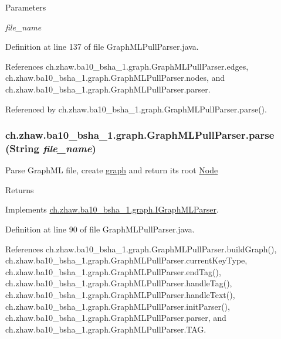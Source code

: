 \begin{DoxyParams}{Parameters}
\item[{\em file\_\-name}]\end{DoxyParams}


Definition at line 137 of file GraphMLPullParser.java.

References ch.zhaw.ba10\_\-bsha\_\-1.graph.GraphMLPullParser.edges, ch.zhaw.ba10\_\-bsha\_\-1.graph.GraphMLPullParser.nodes, and ch.zhaw.ba10\_\-bsha\_\-1.graph.GraphMLPullParser.parser.

Referenced by ch.zhaw.ba10\_\-bsha\_\-1.graph.GraphMLPullParser.parse().\hypertarget{classch_1_1zhaw_1_1ba10__bsha__1_1_1graph_1_1GraphMLPullParser_a4d51cf5d2432541f6777df36b8649d70}{
\subsubsection[{parse}]{ ch.zhaw.ba10\_\-bsha\_\-1.graph.GraphMLPullParser.parse (String {\em file\_\-name})}}
\label{classch_1_1zhaw_1_1ba10__bsha__1_1_1graph_1_1GraphMLPullParser_a4d51cf5d2432541f6777df36b8649d70}
Parse GraphML file, create \hyperlink{namespacech_1_1zhaw_1_1ba10__bsha__1_1_1graph}{graph} and return its root \hyperlink{classch_1_1zhaw_1_1ba10__bsha__1_1_1graph_1_1Node}{Node}

\begin{DoxyReturn}{Returns}

\end{DoxyReturn}


Implements \hyperlink{interfacech_1_1zhaw_1_1ba10__bsha__1_1_1graph_1_1IGraphMLParser_a4b7516793ccd484abfe8ab83f4e57fa8}{ch.zhaw.ba10\_\-bsha\_\-1.graph.IGraphMLParser}.

Definition at line 90 of file GraphMLPullParser.java.

References ch.zhaw.ba10\_\-bsha\_\-1.graph.GraphMLPullParser.buildGraph(), ch.zhaw.ba10\_\-bsha\_\-1.graph.GraphMLPullParser.currentKeyType, ch.zhaw.ba10\_\-bsha\_\-1.graph.GraphMLPullParser.endTag(), ch.zhaw.ba10\_\-bsha\_\-1.graph.GraphMLPullParser.handleTag(), ch.zhaw.ba10\_\-bsha\_\-1.graph.GraphMLPullParser.handleText(), ch.zhaw.ba10\_\-bsha\_\-1.graph.GraphMLPullParser.initParser(), ch.zhaw.ba10\_\-bsha\_\-1.graph.GraphMLPullParser.parser, and ch.zhaw.ba10\_\-bsha\_\-1.graph.GraphMLPullParser.TAG.

